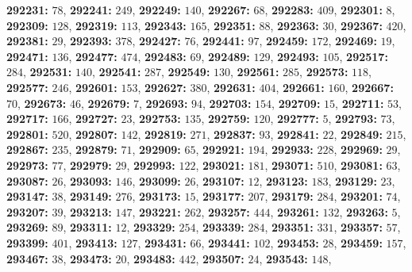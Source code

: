 \textsf{\bfseries 292231:} $78$, \textsf{\bfseries 292241:} $249$, \textsf{\bfseries 292249:} $140$, \textsf{\bfseries 292267:} $68$, \textsf{\bfseries 292283:} $409$, \textsf{\bfseries 292301:} $8$, \textsf{\bfseries 292309:} $128$, \textsf{\bfseries 292319:} $113$, \textsf{\bfseries 292343:} $165$, \textsf{\bfseries 292351:} $88$, \textsf{\bfseries 292363:} $30$, \textsf{\bfseries 292367:} $420$, \textsf{\bfseries 292381:} $29$, \textsf{\bfseries 292393:} $378$, \textsf{\bfseries 292427:} $76$, \textsf{\bfseries 292441:} $97$, \textsf{\bfseries 292459:} $172$, \textsf{\bfseries 292469:} $19$, \textsf{\bfseries 292471:} $136$, \textsf{\bfseries 292477:} $474$, \textsf{\bfseries 292483:} $69$, \textsf{\bfseries 292489:} $129$, \textsf{\bfseries 292493:} $105$, \textsf{\bfseries 292517:} $284$, \textsf{\bfseries 292531:} $140$, \textsf{\bfseries 292541:} $287$, \textsf{\bfseries 292549:} $130$, \textsf{\bfseries 292561:} $285$, \textsf{\bfseries 292573:} $118$, \textsf{\bfseries 292577:} $246$, \textsf{\bfseries 292601:} $153$, \textsf{\bfseries 292627:} $380$, \textsf{\bfseries 292631:} $404$, \textsf{\bfseries 292661:} $160$, \textsf{\bfseries 292667:} $70$, \textsf{\bfseries 292673:} $46$, \textsf{\bfseries 292679:} $7$, \textsf{\bfseries 292693:} $94$, \textsf{\bfseries 292703:} $154$, \textsf{\bfseries 292709:} $15$, \textsf{\bfseries 292711:} $53$, \textsf{\bfseries 292717:} $166$, \textsf{\bfseries 292727:} $23$, \textsf{\bfseries 292753:} $135$, \textsf{\bfseries 292759:} $120$, \textsf{\bfseries 292777:} $5$, \textsf{\bfseries 292793:} $73$, \textsf{\bfseries 292801:} $520$, \textsf{\bfseries 292807:} $142$, \textsf{\bfseries 292819:} $271$, \textsf{\bfseries 292837:} $93$, \textsf{\bfseries 292841:} $22$, \textsf{\bfseries 292849:} $215$, \textsf{\bfseries 292867:} $235$, \textsf{\bfseries 292879:} $71$, \textsf{\bfseries 292909:} $65$, \textsf{\bfseries 292921:} $194$, \textsf{\bfseries 292933:} $228$, \textsf{\bfseries 292969:} $29$, \textsf{\bfseries 292973:} $77$, \textsf{\bfseries 292979:} $29$, \textsf{\bfseries 292993:} $122$, \textsf{\bfseries 293021:} $181$, \textsf{\bfseries 293071:} $510$, \textsf{\bfseries 293081:} $63$, \textsf{\bfseries 293087:} $26$, \textsf{\bfseries 293093:} $146$, \textsf{\bfseries 293099:} $26$, \textsf{\bfseries 293107:} $12$, \textsf{\bfseries 293123:} $183$, \textsf{\bfseries 293129:} $23$, \textsf{\bfseries 293147:} $38$, \textsf{\bfseries 293149:} $276$, \textsf{\bfseries 293173:} $15$, \textsf{\bfseries 293177:} $207$, \textsf{\bfseries 293179:} $284$, \textsf{\bfseries 293201:} $74$, \textsf{\bfseries 293207:} $39$, \textsf{\bfseries 293213:} $147$, \textsf{\bfseries 293221:} $262$, \textsf{\bfseries 293257:} $444$, \textsf{\bfseries 293261:} $132$, \textsf{\bfseries 293263:} $5$, \textsf{\bfseries 293269:} $89$, \textsf{\bfseries 293311:} $12$, \textsf{\bfseries 293329:} $254$, \textsf{\bfseries 293339:} $284$, \textsf{\bfseries 293351:} $331$, \textsf{\bfseries 293357:} $57$, \textsf{\bfseries 293399:} $401$, \textsf{\bfseries 293413:} $127$, \textsf{\bfseries 293431:} $66$, \textsf{\bfseries 293441:} $102$, \textsf{\bfseries 293453:} $28$, \textsf{\bfseries 293459:} $157$, \textsf{\bfseries 293467:} $38$, \textsf{\bfseries 293473:} $20$, \textsf{\bfseries 293483:} $442$, \textsf{\bfseries 293507:} $24$, \textsf{\bfseries 293543:} $148$, 
